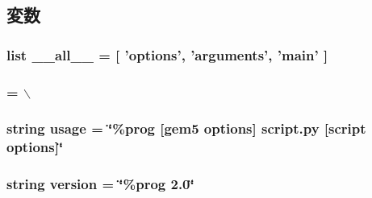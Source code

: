 \subsection{変数}
\hypertarget{namespacem5_1_1main_aa4a022e6ddacd362b83964da5cc5d044}{
\subsubsection[{\_\-\_\-all\_\-\_\-}]{\setlength{\rightskip}{0pt plus 5cm}list {\bf \_\-\_\-all\_\-\_\-} = \mbox{[} 'options', 'arguments', 'main' \mbox{]}}}
\label{namespacem5_1_1main_aa4a022e6ddacd362b83964da5cc5d044}
\hypertarget{namespacem5_1_1main_ada1894ffa84d88fb55d34087f203ddca}{
\subsubsection[{brief\_\-copyright}]{ = $\backslash$}}
\label{namespacem5_1_1main_ada1894ffa84d88fb55d34087f203ddca}
\hypertarget{namespacem5_1_1main_a61e5f066c879e5430d8f713c2c3a8b31}{
\subsubsection[{usage}]{\setlength{\rightskip}{0pt plus 5cm}string {\bf usage} = \char`\"{}\%prog \mbox{[}gem5 options\mbox{]} script.py \mbox{[}script options\mbox{]}\char`\"{}}}
\label{namespacem5_1_1main_a61e5f066c879e5430d8f713c2c3a8b31}
\hypertarget{namespacem5_1_1main_af9c8593b58583463efe6932e24c9d6e6}{
\subsubsection[{version}]{\setlength{\rightskip}{0pt plus 5cm}string {\bf version} = \char`\"{}\%prog 2.0\char`\"{}}}
\label{namespacem5_1_1main_af9c8593b58583463efe6932e24c9d6e6}
